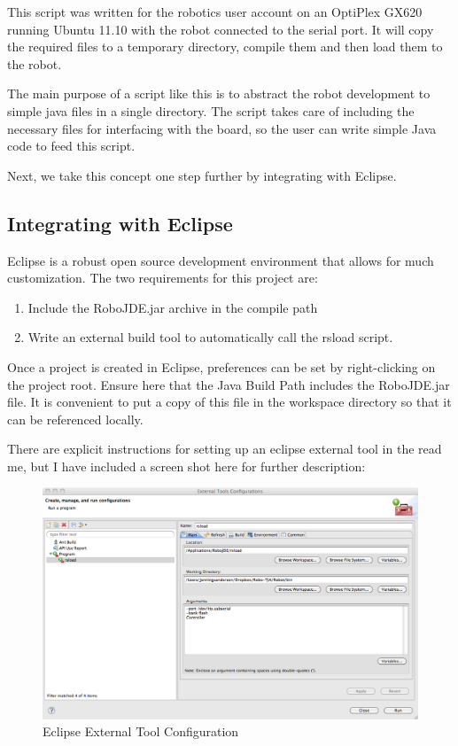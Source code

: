 \documentclass[12pt]{article}
\begin{document}
This script was written for the robotics user account on an OptiPlex GX620 running Ubuntu 11.10 with the robot connected to the serial port.  It will copy the required files to a temporary directory, compile them and then load them to the robot.

The main purpose of a script like this is to abstract the robot development to simple java files in a single directory.  The script takes care of including the necessary files for interfacing with the board, so the user can write simple Java code to feed this script.

Next, we take this concept one step further by integrating with Eclipse.

\subsection{Integrating with Eclipse}
Eclipse is a robust open source development environment that allows for much customization.  The two requirements for this project are:
\begin{enumerate}
\item Include the RoboJDE.jar archive in the compile path
\item Write an external build tool to automatically call the rsload script.
\end{enumerate}

Once a project is created in Eclipse, preferences can be set by right-clicking on the project root.  Ensure here that the Java Build Path includes the RoboJDE.jar file.  It is convenient to put a copy of this file in the workspace directory so that it can be referenced locally.

There are explicit instructions for setting up an eclipse external tool in the read me, but I have included a screen shot here for further description:
\clearpage
\begin{figure}[h]
\includegraphics[scale=.4]{img/externalTool}
\caption{Eclipse External Tool Configuration}
\end{figure}
\end{document}
